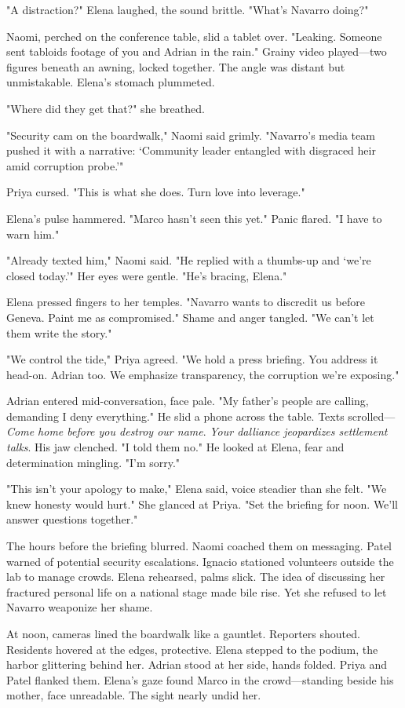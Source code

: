 "A distraction?" Elena laughed, the sound brittle. "What's Navarro doing?"

Naomi, perched on the conference table, slid a tablet over. "Leaking. Someone sent tabloids footage of you and Adrian in the rain." Grainy video played—two figures beneath an awning, locked together. The angle was distant but unmistakable. Elena's stomach plummeted.

"Where did they get that?" she breathed.

"Security cam on the boardwalk," Naomi said grimly. "Navarro's media team pushed it with a narrative: `Community leader entangled with disgraced heir amid corruption probe.'"

Priya cursed. "This is what she does. Turn love into leverage."

Elena's pulse hammered. "Marco hasn't seen this yet." Panic flared. "I have to warn him."

"Already texted him," Naomi said. "He replied with a thumbs-up and `we're closed today.'" Her eyes were gentle. "He's bracing, Elena."

Elena pressed fingers to her temples. "Navarro wants to discredit us before Geneva. Paint me as compromised." Shame and anger tangled. "We can't let them write the story."

"We control the tide," Priya agreed. "We hold a press briefing. You address it head-on. Adrian too. We emphasize transparency, the corruption we're exposing."

Adrian entered mid-conversation, face pale. "My father's people are calling, demanding I deny everything." He slid a phone across the table. Texts scrolled—\textit{Come home before you destroy our name}. \textit{Your dalliance jeopardizes settlement talks}. His jaw clenched. "I told them no." He looked at Elena, fear and determination mingling. "I'm sorry."

"This isn't your apology to make," Elena said, voice steadier than she felt. "We knew honesty would hurt." She glanced at Priya. "Set the briefing for noon. We'll answer questions together."

The hours before the briefing blurred. Naomi coached them on messaging. Patel warned of potential security escalations. Ignacio stationed volunteers outside the lab to manage crowds. Elena rehearsed, palms slick. The idea of discussing her fractured personal life on a national stage made bile rise. Yet she refused to let Navarro weaponize her shame.

At noon, cameras lined the boardwalk like a gauntlet. Reporters shouted. Residents hovered at the edges, protective. Elena stepped to the podium, the harbor glittering behind her. Adrian stood at her side, hands folded. Priya and Patel flanked them. Elena's gaze found Marco in the crowd—standing beside his mother, face unreadable. The sight nearly undid her.

